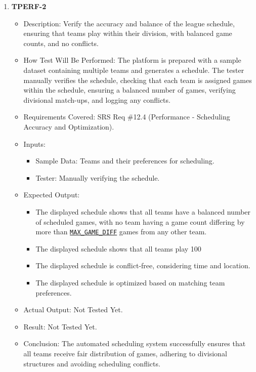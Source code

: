 \documentclass[12pt, titlepage]{article}
\begin{document}
\begin{enumerate}
\item \textbf{TPERF-2}  
    \begin{itemize}
        \item Description: Verify the accuracy and balance of the league schedule, ensuring that teams play within their division, with balanced game counts, and no conflicts.
        \item How Test Will Be Performed: The platform is prepared with a sample dataset containing multiple teams and generates a schedule. The tester manually verifies the schedule, checking that each team is assigned games within the schedule, ensuring a balanced number of games, verifying divisional match-ups, and logging any conflicts.
        \item Requirements Covered: SRS Req \#12.4 (Performance - Scheduling Accuracy and Optimization).
        \item Inputs:  
            \begin{itemize}
                \item Sample Data: Teams and their preferences for scheduling.
                \item Tester: Manually verifying the schedule.
            \end{itemize}
        \item Expected Output:  
            \begin{itemize}
                \item The displayed schedule shows that all teams have a balanced number of scheduled games, with no team having a game count differing by more than \hyperref[MAX_GAME_DIFF]{\texttt{MAX\_GAME\_DIFF}} games from any other team.
                \item The displayed schedule shows that all teams play 100%
                \item The displayed schedule is conflict-free, considering time and location.
                \item The displayed schedule is optimized based on matching team preferences.
            \end{itemize}
        \item Actual Output: Not Tested Yet.
        \item Result: Not Tested Yet.
        \item Conclusion: The automated scheduling system successfully ensures that all teams receive fair distribution of games,
		adhering to divisional structures and avoiding scheduling conflicts.
    \end{itemize}


\end{enumerate}
\end{document}
